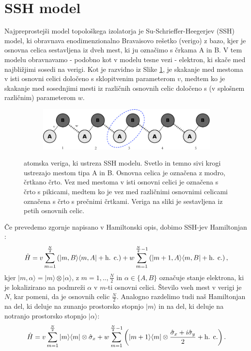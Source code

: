 \section{SSH model}
Najpreprostejši model topološkega izolatorja je Su-Schrieffer-Heegerjev (SSH) model, ki obravnava enodimenzionalno Bravaisovo rešetko (verigo) z bazo, kjer je osnovna celica sestavljena iz dveh mest, ki ju označimo s črkama A in B. V tem modelu obravnavamo - podobno kot v modelu tesne vezi - elektron, ki skače med najbližjimi sosedi na verigi. Kot je razvidno iz Slike \ref{fig:chain}, je skakanje med mestoma v isti osnovni celici določeno s sklopitvenim parameterom $v$, medtem ko je skakanje med sosednjimi mesti iz različnih osnovnih celic določeno s (v splošnem različnim) parameterom $w$.
\begin{figure}[H]
\centering
\begin{subfigure}{.9\textwidth}
\includegraphics[width=\linewidth]{Figures/MySSHChain.pdf}
\end{subfigure}
\caption{atomska veriga, ki ustreza SSH modelu. Svetlo in temno sivi krogi ustrezajo mestom tipa A in B. Osnovna celica je označena z modro, črtkano črto. Vez med mestoma v isti osnovni celici je označena s črto s pikicami, medtem ko je vez med različnimi osnovnimi celicami označena s črto s prečnimi črtkami. Veriga na sliki je sestavljena iz petih osnovnih celic. }
\label{fig:chain}
\end{figure}
Če prevedemo zgornje napisano v Hamiltonski opis, dobimo SSH-jev Hamiltonjan \cite{SSH}:
\begin{equation}
\hat{H} = v \sum_{m=1}^{\frac{N}{2}} \left( |m, B \rangle \langle m, A | + \textup{h. c.} \right) + w \sum_{m=1}^{\frac{N}{2}-1} \left( | m+1, A \rangle \langle m, B | + \textup{h. c.} \right),
\end{equation}
kjer $|m , \alpha \rangle = |m \rangle \otimes | \alpha \rangle$, z $m=1,.., \frac{N}{2}$ in $\alpha \in \{A,B\}$ označuje stanje elektrona, ki je lokalizirano na podmreži $\alpha$ v $m$-ti osnovni celici. Število vseh mest v verigi je $N$, kar pomeni, da je osnovnih celic $\frac{N}{2}$.  Analogno razdelimo tudi naš Hamiltonjan na del, ki deluje na zunanjo prostorsko stopnjo $|m \rangle$ in na del, ki deluje na notranjo prostorsko stopnjo $| \alpha \rangle$:
\begin{equation}
\hat{H} = v \sum_{m=1}^{\frac{N}{2}} |m \rangle \langle m| \otimes \hat{\sigma}_x + w \sum_{m=1}^{\frac{N}{2}-1} \left( | m+1\rangle \langle m | \otimes \frac{\hat{\sigma}_x + i \hat{\sigma}_y}{2} + \textup{h. c.} \right).
\end{equation}
\newpage
